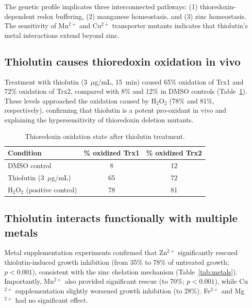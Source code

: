 \documentclass[11pt]{article}
\begin{document}
The genetic profile implicates three interconnected pathways: (1) thioredoxin-dependent redox buffering, (2) manganese homeostasis, and (3) zinc homeostasis. The sensitivity of Mn$^{2+}$ and Cu$^{2+}$ transporter mutants indicates that thiolutin's metal interactions extend beyond zinc.

\subsection{Thiolutin causes thioredoxin oxidation in vivo}

Treatment with thiolutin (3~$\mu$g/mL, 15~min) caused 65\% oxidation of Trx1 and 72\% oxidation of Trx2, compared with 8\% and 12\% in DMSO controls (Table~\ref{tab:trx}). These levels approached the oxidation caused by H$_2$O$_2$ (78\% and 81\%, respectively), confirming that thiolutin is a potent pro-oxidant in vivo and explaining the hypersensitivity of thioredoxin deletion mutants.

\begin{table}[ht]
\centering
\caption{Thioredoxin oxidation state after thiolutin treatment.}
\label{tab:trx}
\begin{tabular}{lcc}
\toprule
\textbf{Condition} & \textbf{\% oxidized Trx1} & \textbf{\% oxidized Trx2} \\
\midrule
DMSO control & 8 & 12 \\
Thiolutin (3~$\mu$g/mL) & 65 & 72 \\
H$_2$O$_2$ (positive control) & 78 & 81 \\
\bottomrule
\end{tabular}
\end{table}

\subsection{Thiolutin interacts functionally with multiple metals}

Metal supplementation experiments confirmed that Zn$^{2+}$ significantly rescued thiolutin-induced growth inhibition (from 35\% to 78\% of untreated growth; $p < 0.001$), consistent with the zinc chelation mechanism (Table~\ref{tab:metals}). Importantly, Mn$^{2+}$ also provided significant rescue (to 70\%; $p < 0.001$), while Cu$^{2+}$ supplementation slightly worsened growth inhibition (to 28\%). Fe$^{2+}$ and Mg$^{2+}$ had no significant effect.
\end{document}
